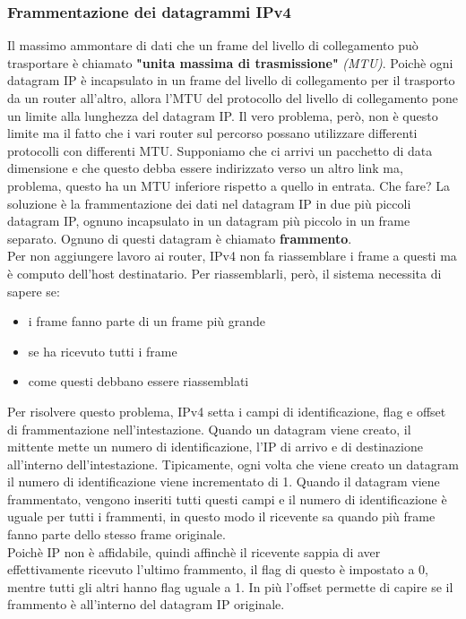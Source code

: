 \documentclass[11pt,a4paper]{article}
\begin{document}
\subsubsection{Frammentazione dei datagrammi IPv4}
Il massimo ammontare di dati che un frame del livello di collegamento può trasportare è chiamato \textbf{"unita massima di trasmissione"} \textit{(MTU)}. Poichè ogni datagram IP è incapsulato in un frame del livello di collegamento per il trasporto da un router all'altro, allora l'MTU del protocollo del livello di collegamento pone un limite alla lunghezza del datagram IP. Il vero problema, però, non è questo limite ma il fatto che i vari router sul percorso possano utilizzare differenti protocolli con differenti MTU. Supponiamo che ci arrivi un pacchetto di data dimensione e che questo debba essere indirizzato verso un altro link ma, problema, questo ha un MTU inferiore rispetto a quello in entrata. Che fare? La soluzione è la frammentazione dei dati nel datagram IP in due più piccoli datagram IP, ognuno incapsulato in un datagram più piccolo in un frame separato. Ognuno di questi datagram è chiamato \textbf{frammento}. \\
Per non aggiungere lavoro ai router, IPv4 non fa riassemblare i frame a questi ma è computo dell'host destinatario. Per riassemblarli, però, il sistema necessita di sapere se:
\begin{itemize}
	\item i frame fanno parte di un frame più grande
	\item se ha ricevuto tutti i frame
	\item come questi debbano essere riassemblati
\end{itemize} 
Per risolvere questo problema, IPv4 setta i campi di identificazione, flag e offset di frammentazione nell'intestazione. Quando un datagram viene creato, il mittente mette un numero di identificazione, l'IP di arrivo e di destinazione all'interno dell'intestazione. Tipicamente, ogni volta che viene creato un datagram il numero di identificazione viene incrementato di 1. Quando il datagram viene frammentato, vengono inseriti tutti questi campi e il numero di identificazione è uguale per tutti i frammenti, in questo modo il ricevente sa quando più frame fanno parte dello stesso frame originale. \\
Poichè IP non è affidabile, quindi affinchè il ricevente sappia di aver effettivamente ricevuto l'ultimo frammento, il flag di questo è impostato a 0, mentre tutti gli altri hanno flag uguale a 1. In più l'offset permette di capire se il frammento è all'interno del datagram IP originale. \\
\end{document}
